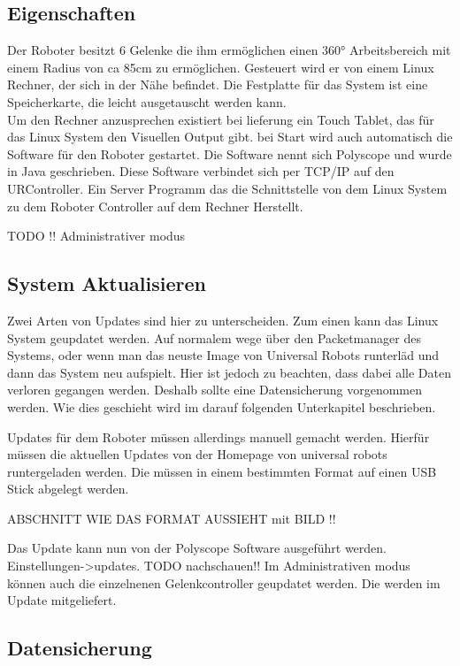 \subsection{Eigenschaften}
\label{ur_eigenschaften_gru}

Der Roboter besitzt 6 Gelenke die ihm ermöglichen einen 360° Arbeitsbereich mit einem Radius von ca 85cm zu ermöglichen. Gesteuert wird er von einem Linux Rechner, der sich in der Nähe befindet. 
Die Festplatte für das System ist eine Speicherkarte, die leicht ausgetauscht werden kann.
\\
Um den Rechner anzusprechen existiert bei lieferung ein Touch Tablet, das für das Linux System den Visuellen Output gibt. bei Start wird auch automatisch die Software für den Roboter gestartet. Die Software nennt sich Polyscope und wurde in Java geschrieben. Diese Software verbindet sich per TCP/IP auf den URController. Ein Server Programm das die Schnittstelle von dem Linux System zu dem Roboter Controller auf dem Rechner Herstellt.

TODO !! Administrativer modus

\subsection{System Aktualisieren}
\label{ur_update_gru}

Zwei Arten von Updates sind hier zu unterscheiden. Zum einen kann das Linux System geupdatet werden. Auf normalem wege über den Packetmanager des Systems, oder wenn man das neuste Image von Universal Robots runterläd und dann das System neu aufspielt. Hier ist jedoch zu beachten, dass dabei alle Daten verloren gegangen werden. Deshalb sollte eine Datensicherung vorgenommen werden. Wie dies geschieht wird im darauf folgenden Unterkapitel beschrieben.

Updates für dem Roboter müssen allerdings manuell gemacht werden. Hierfür müssen die aktuellen Updates von der Homepage von universal robots runtergeladen werden. Die müssen in einem bestimmten Format auf einen USB Stick abgelegt werden.

ABSCHNITT WIE DAS FORMAT AUSSIEHT mit BILD !!

Das Update kann nun von der Polyscope Software ausgeführt werden. Einstellungen->updates. TODO nachschauen!!
Im Administrativen modus können auch die einzelnenen Gelenkcontroller geupdatet werden. Die werden im Update mitgeliefert.


\subsection{Datensicherung}
\label{ur_datensicherung_gru}

